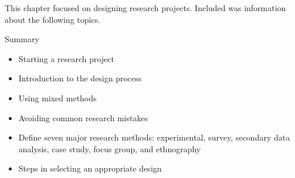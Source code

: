 This chapter focused on designing research projects. Included was information about the following topics.

\begin{center}
	\begin{tkawybox}{Summary}
		\begin{itemize}
			\setlength{\itemsep}{0pt}
			\setlength{\parskip}{0pt}
			\setlength{\parsep}{0pt}
			
			\item Starting a research project
			\item Introduction to the design process
			\item Using mixed methods
			\item Avoiding common research mistakes
			\item Define seven major research methods: experimental, survey, secondary data analysis, case study, focus group, and ethnography
			\item Steps in selecting an appropriate design
		\end{itemize}
	\end{tkawybox}
\end{center}

